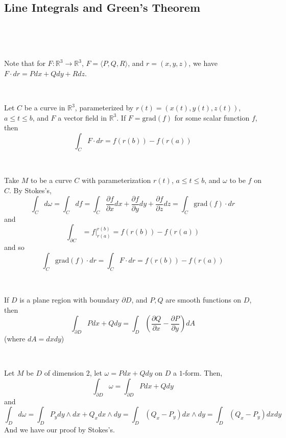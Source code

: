 \documentclass{article}
\begin{document}
\subsection{Line Integrals and Green's Theorem}
\

\begin{remark}
  \

  Note that for $F: \mathbb{R}^3 \to \mathbb{R}^3$, $F = \langle P, Q, R \rangle$, and $r = (x,y,z)$, we have $F \cdot dr = P dx + Q dy + R dz$.
\end{remark}

\begin{theorem}
  \

  Let $C$ be a curve in $\mathbb{R}^3$, parameterized by $r(t) = (x(t), y(t), z(t))$, $a \leq t \leq b$, and $F$ a vector field in $\mathbb{R}^3$. If $F = \text{grad}(f)$ for some scalar function $f$, then $$\int_C F \cdot dr = f(r(b)) - f(r(a))$$
\end{theorem}

\begin{customproof}
  \

  Take $M$ to be a curve $C$ with parameterization $r(t)$, $a \leq t \leq b$, and $\omega$ to be $f$ on $C$. By Stokes's, $$\int_C d\omega = \int_C df = \int_C \frac{\partial f}{\partial x} dx + \frac{\partial f}{\partial y} dy + \frac{\partial f}{\partial z} dz = \int_C \text{grad}(f) \cdot dr$$and $$\int_{\partial C} = f \vert_{r(a)}^{r(b)} = f(r(b)) - f(r(a))$$and so $$\int_C \text{grad}(f) \cdot dr = \int_C F \cdot dr = f(r(b)) - f(r(a))$$
\end{customproof}

\begin{theorem}
  \

  If $D$ is a plane region with boundary $\partial D$, and $P, Q$ are smooth functions on $D$, then $$\int_{\partial D} P dx + Q dy = \int_D (\frac{\partial Q}{\partial x} - \frac{\partial P}{\partial y} )dA$$(where $dA = dxdy$)
\end{theorem}

\begin{customproof}
  \

  Let $M$ be $D$ of dimension $2$, let $\omega = Pdx + Qdy$ on $D$ a $1$-form. Then, $$\int_{\partial D} \omega = \int_{\partial D} Pdx + Qdy$$and$$\int_D d\omega = \int_D P_y dy\wedge dx + Q_xdx\wedge dy = \int_D (Q_x-P_y) dx\wedge dy = \int_D (Q_x - P_y) dxdy$$And we have our proof by Stokes's.
\end{customproof}
\end{document}
